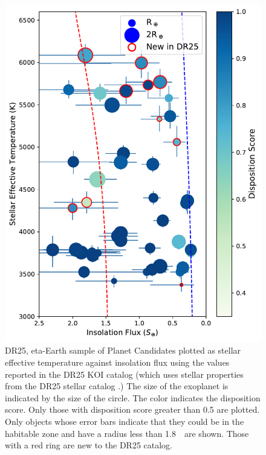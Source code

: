 \begin{figure}[tb]
    \centering
    \includegraphics[width=\linewidth]{f14.pdf}
    \caption{DR25, eta-Earth sample of Planet Candidates plotted as stellar effective temperature against insolation flux using the values reported in the DR25 KOI catalog (which uses stellar properties from the DR25 stellar catalog \citep{Mathur2017ApJS}.) The size of the exoplanet is indicated by the size of the circle.  The color indicates the disposition score. Only those with disposition score greater than 0.5 are plotted.  Only objects whose error bars indicate that they could be in the habitable zone and have a radius less than 1.8~\re\ are shown. Those with a red ring are new to the DR25 catalog. }
    \label{f:hzPlot}
\end{figure}


